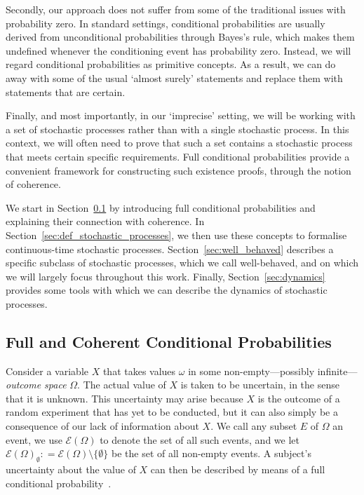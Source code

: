 \documentclass[10pt,a4paper]{paper}
\theoremstyle{definition}
\newcommand{\paths}{\Omega}
\newcommand{\power}{\mathcal{E}(\paths)}
\newcommand{\nonemptypower}{\power_{\emptyset}}
\newcommand{\coloneqq}{:\!=}
\begin{document}
Secondly, our approach does not suffer from some of the traditional issues with probability zero. In standard settings, conditional probabilities are usually derived from unconditional probabilities through Bayes's rule, which makes them undefined whenever the conditioning event has probability zero. Instead, we will regard conditional probabilities as primitive concepts. As a result, we can do away with some of the usual `almost surely' statements and replace them with statements that are certain.

Finally, and most importantly, in our `imprecise' setting, we will be working with a set of stochastic processes rather than with a single stochastic process. In this context, we will often need to prove that such a set contains a stochastic process that meets certain specific requirements. 
Full conditional probabilities provide a convenient framework for constructing such existence proofs, through the notion of coherence.


We start in Section~\ref{sec:cond_prob} by introducing full conditional probabilities and explaining their connection with coherence. In Section~\ref{sec:def_stochastic_processes}, we then use these concepts to formalise continuous-time stochastic processes. Section~\ref{sec:well_behaved} describes a specific subclass of stochastic processes, which we call well-behaved, and on which we will largely focus throughout this work. Finally, Section~\ref{sec:dynamics} provides some tools with which we can describe the dynamics of stochastic processes.

\subsection{Full and Coherent Conditional Probabilities}\label{sec:cond_prob}


Consider a variable $X$ that takes values $\omega$ in some non-empty---possibly infinite---\emph{outcome space} $\Omega$. The actual value of $X$ is taken to be uncertain, in the sense that it is unknown. This uncertainty may arise because $X$ is the outcome of a random experiment that has yet to be conducted, but it can also simply be a consequence of our lack of information about $X$. 
We call any subset $E$ of $\Omega$ an event, we use $\power$ to denote the set of all such events, and we let $\nonemptypower\coloneqq\power\setminus\{\emptyset\}$ be the set of all non-empty events. 
A subject's uncertainty about the value of $X$ can then be described by means of a full conditional probability~\cite{Dubins:1975ej}.
\end{document}
